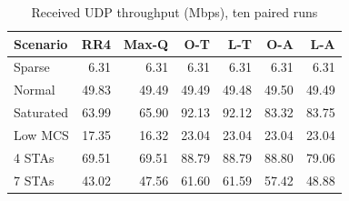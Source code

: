 \begin{table}[t]
\caption{Received UDP throughput (Mbps), ten paired runs}
\label{tab:throughput}
\centering\footnotesize
\setlength{\tabcolsep}{3pt}
\begin{tabular}{lrrrrrr}
\toprule
Scenario & RR4 & Max-Q & O-T & L-T & O-A & L-A \\
\midrule
Sparse & 6.31 & 6.31 & 6.31 & 6.31 & 6.31 & 6.31 \\
Normal & 49.83 & 49.49 & 49.49 & 49.48 & 49.50 & 49.49 \\
Saturated & 63.99 & 65.90 & 92.13 & 92.12 & 83.32 & 83.75 \\
Low MCS & 17.35 & 16.32 & 23.04 & 23.04 & 23.04 & 23.04 \\
4 STAs & 69.51 & 69.51 & 88.79 & 88.79 & 88.80 & 79.06 \\
7 STAs & 43.02 & 47.56 & 61.60 & 61.59 & 57.42 & 48.88 \\
\bottomrule
\end{tabular}
\end{table}
